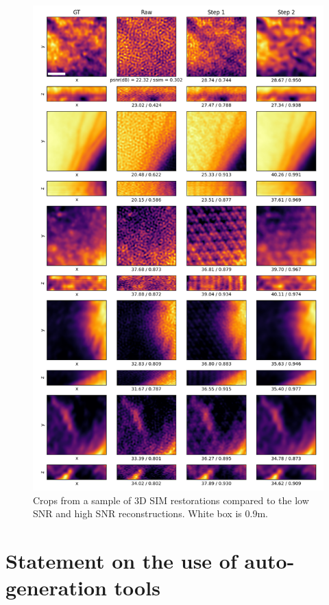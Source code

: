 \documentclass[12pt]{article}
\begin{document}
\begin{figure}[hbtp]
    \includegraphics[scale=0.65, center]{figures/m021_m022_reconstruction_samples.png}
    \caption{Crops from a sample of 3D SIM restorations compared to the low SNR and high SNR reconstructions.
    White box is 0.9\textmu m.}
    \label{fig:3D_further_samples}
\end{figure}

\newpage

\section{Statement on the use of auto-generation tools}
\end{document}

